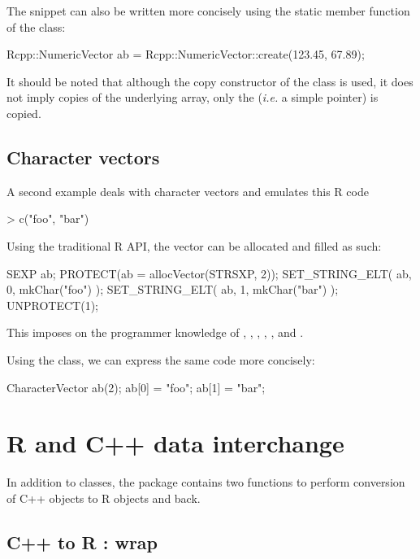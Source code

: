 The snippet can also be written more concisely using the 
static member function of the  class: 

\begin{example}
Rcpp::NumericVector ab = 
  Rcpp::NumericVector::create(123.45, 67.89);
\end{example}

It should be noted that although the copy constructor of the 
 class is used, it does not imply copies of the 
underlying array, only the  (\textsl{i.e.} a simple pointer) is copied. 

\subsection{Character vectors}

A second example deals with character vectors and emulates this R code

\begin{example}
> c("foo", "bar")
\end{example}

Using the traditional R API, the vector can be allocated and filled as such:

\begin{example}
SEXP ab;
PROTECT(ab = allocVector(STRSXP, 2));
SET_STRING_ELT( ab, 0, mkChar("foo") );
SET_STRING_ELT( ab, 1, mkChar("bar") );
UNPROTECT(1);
\end{example}

This imposes on the programmer knowledge of , , 
, , , and . 

Using the  class, we can express the same
code more concisely:

\begin{example}
CharacterVector ab(2);
ab[0] = "foo";
ab[1] = "bar";
\end{example}

\section{R and C++ data interchange}

In addition to classes, the  package contains two 
functions to perform conversion of C++ objects to R objects and back. 

\subsection{C++ to R : wrap}

